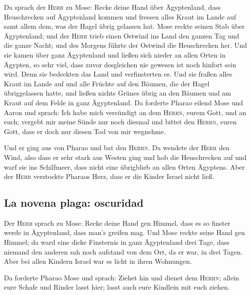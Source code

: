  Da sprach der \textsc{Herr} zu Mose: Recke deine Hand
über Ägyptenland, dass Heuschrecken auf Ägyptenland kommen und fressen
alles Kraut im Lande auf samt allem dem, was der Hagel übrig gelassen
hat.  Mose reckte seinen Stab über Ägyptenland; und der
\textsc{Herr} trieb einen Ostwind ins Land den ganzen Tag und die ganze
Nacht; und des Morgens führte der Ostwind die Heuschrecken her.
 Und sie kamen über ganz Ägyptenland und ließen sich
nieder an allen Orten in Ägypten, so sehr viel, dass zuvor desgleichen
nie gewesen ist noch hinfort sein wird.  Denn sie
bedeckten das Land und verfinsterten es. Und sie fraßen alles Kraut im
Lande auf und alle Früchte auf den Bäumen, die der Hagel übriggelassen
hatte, und ließen nichts Grünes übrig an den Bäumen und am Kraut auf dem
Felde in ganz Ägyptenland.  Da forderte Pharao eilend
Mose und Aaron und sprach: Ich habe mich versündigt an dem
\textsc{Herrn}, eurem Gott, und an euch;  vergebt mir
meine Sünde nur noch diesmal und bittet den \textsc{Herrn}, euren Gott,
dass er doch nur diesen Tod von mir wegnehme.

 Und er ging aus von Pharao und bat den \textsc{Herrn}.
 Da wendete der \textsc{Herr} den Wind, also dass er sehr
stark aus Westen ging und hob die Heuschrecken auf und warf sie ins
Schilfmeer, dass nicht eine übrigblieb an allen Orten Ägyptens.
 Aber der \textsc{Herr} verstockte Pharaos Herz, dass er
die Kinder Israel nicht ließ.

\hypertarget{la-novena-plaga-oscuridad}{%
\subsection{La novena plaga:
oscuridad}\label{la-novena-plaga-oscuridad}}

 Der \textsc{Herr} sprach zu Mose: Recke deine Hand gen
Himmel, dass es so finster werde in Ägyptenland, dass man's greifen mag.
 Und Mose reckte seine Hand gen Himmel; da ward eine
dicke Finsternis in ganz Ägyptenland drei Tage,  dass
niemand den anderen sah noch aufstand von dem Ort, da er war, in drei
Tagen. Aber bei allen Kindern Israel war es licht in ihren Wohnungen.

 Da forderte Pharao Mose und sprach: Ziehet hin und
dienet dem \textsc{Herrn}; allein eure Schafe und Rinder lasst hier;
lasst auch eure Kindlein mit euch ziehen.

